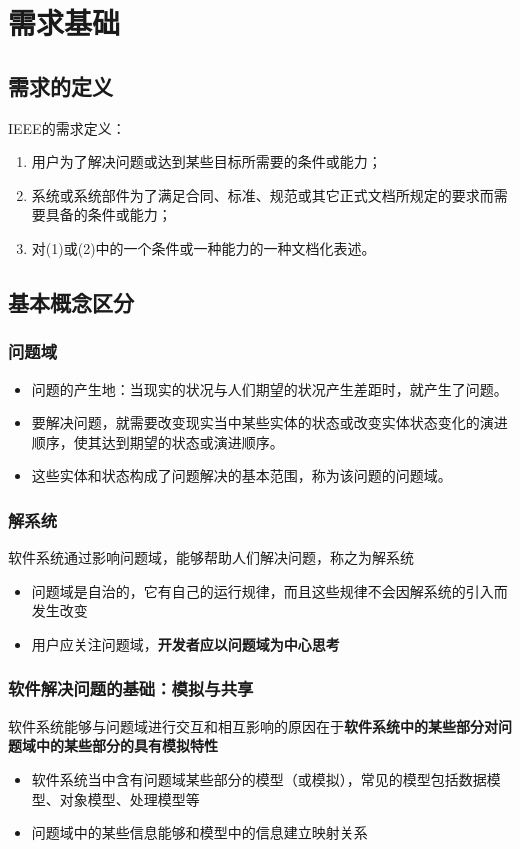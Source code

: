 \section{需求基础}

\subsection{需求的定义}
IEEE的需求定义：
\begin{enumerate}[label=(\arabic*)]
    \item 用户为了解决问题或达到某些目标所需要的条件或能力；
    \item 系统或系统部件为了满足合同、标准、规范或其它正式文档所规定的要求而需要具备的条件或能力；
    \item 对(1)或(2)中的一个条件或一种能力的一种文档化表述。
\end{enumerate}

\subsection{基本概念区分}

\subsubsection{问题域}
\begin{itemize}
    \item 问题的产生地：当现实的状况与人们期望的状况产生差距时，就产生了问题。
    \item 要解决问题，就需要改变现实当中某些实体的状态或改变实体状态变化的演进顺序，使其达到期望的状态或演进顺序。
    \item 这些实体和状态构成了问题解决的基本范围，称为该问题的问题域。
\end{itemize}

\subsubsection{解系统}
软件系统通过影响问题域，能够帮助人们解决问题，称之为解系统
\begin{itemize}
    \item 问题域是自治的，它有自己的运行规律，而且这些规律不会因解系统的引入而发生改变
    \item 用户应关注问题域，\textbf{开发者应以问题域为中心思考}
\end{itemize}

\subsubsection{软件解决问题的基础：模拟与共享}
软件系统能够与问题域进行交互和相互影响的原因在于\textbf{软件系统中的某些部分对问题域中的某些部分的具有模拟特性}
\begin{itemize}
    \item 软件系统当中含有问题域某些部分的模型（或模拟），常见的模型包括数据模型、对象模型、处理模型等
    \item 问题域中的某些信息能够和模型中的信息建立映射关系
\end{itemize}
 
